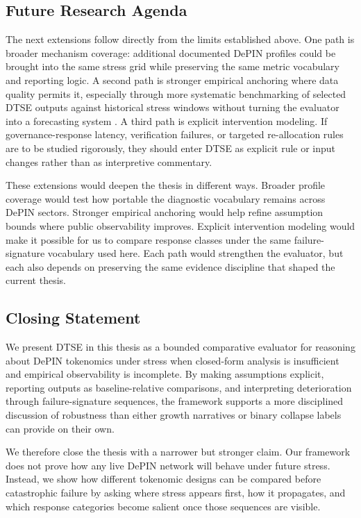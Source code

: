 \subsection{Future Research Agenda}
\label{subsec:future_research_agenda}
The next extensions follow directly from the limits established above. One path is broader mechanism coverage: additional documented DePIN profiles could be brought into the same stress grid while preserving the same metric vocabulary and reporting logic. A second path is stronger empirical anchoring where data quality permits it, especially through more systematic benchmarking of selected DTSE outputs against historical stress windows without turning the evaluator into a forecasting system \cite{McCulloch2022, Collins2024}. A third path is explicit intervention modeling. If governance-response latency, verification failures, or targeted re-allocation rules are to be studied rigorously, they should enter DTSE as explicit rule or input changes rather than as interpretive commentary.

These extensions would deepen the thesis in different ways. Broader profile coverage would test how portable the diagnostic vocabulary remains across DePIN sectors. Stronger empirical anchoring would help refine assumption bounds where public observability improves. Explicit intervention modeling would make it possible for us to compare response classes under the same failure-signature vocabulary used here. Each path would strengthen the evaluator, but each also depends on preserving the same evidence discipline that shaped the current thesis.

\subsection{Closing Statement}
We present DTSE in this thesis as a bounded comparative evaluator for reasoning about DePIN tokenomics under stress when closed-form analysis is insufficient and empirical observability is incomplete. By making assumptions explicit, reporting outputs as baseline-relative comparisons, and interpreting deterioration through failure-signature sequences, the framework supports a more disciplined discussion of robustness than either growth narratives or binary collapse labels can provide on their own.

We therefore close the thesis with a narrower but stronger claim. Our framework does not prove how any live DePIN network will behave under future stress. Instead, we show how different tokenomic designs can be compared before catastrophic failure by asking where stress appears first, how it propagates, and which response categories become salient once those sequences are visible.
